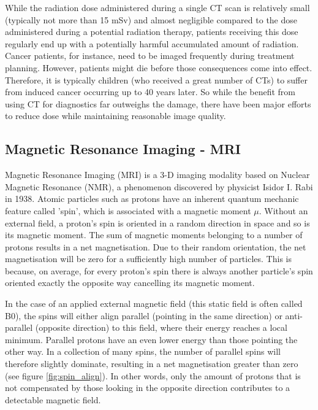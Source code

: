 While the radiation dose administered during a single CT scan is relatively small (typically not more than 15 mSv) and almost negligible compared to the dose administered during a potential radiation therapy, patients receiving this dose regularly end up with a potentially harmful accumulated amount of radiation.
Cancer patients, for instance, need to be imaged frequently during treatment planning.
However, patients might die before those consequences come into effect.
Therefore, it is typically children (who received a great number of CTs) to suffer from induced cancer occurring up to 40 years later.
So while the benefit from using CT for diagnostics far outweighs the damage, there have been major efforts to reduce dose while maintaining reasonable image quality.
\cite{Sodickson2009, McCollough2009, Murphy2007, Smith2007, Goldman2013, Brenner2001}


\subsection{Magnetic Resonance Imaging - MRI}
\label{sec:MRI}
Magnetic Resonance Imaging (MRI) is a 3-D imaging modality based on Nuclear Magnetic Resonance (NMR), a phenomenon discovered by physicist Isidor I. Rabi in 1938.
Atomic particles such as protons have an inherent quantum mechanic feature called 'spin', which is associated with a magnetic moment $\mu$.
Without an external field, a proton's spin is oriented in a random direction in space and so is its magnetic moment.
The sum of magnetic moments belonging to a number of protons results in a net magnetisation.
Due to their random orientation, the net magnetisation will be zero for a sufficiently high number of particles.
This is because, on average, for every proton's spin there is always another particle's spin oriented exactly the opposite way cancelling its magnetic moment.

In the case of an applied external magnetic field (this static field is often called B0), the spins will either align parallel (pointing in the same direction) or anti-parallel (opposite direction) to this field, where their energy reaches a local minimum.
Parallel protons have an even lower energy than those pointing the other way.
In a collection of many spins, the number of parallel spins will therefore slightly dominate, resulting in a net magnetisation greater than zero (see figure \ref{fig:spin_align}).
In other words, only the amount of protons that is not compensated by those looking in the opposite direction contributes to a detectable magnetic field.

